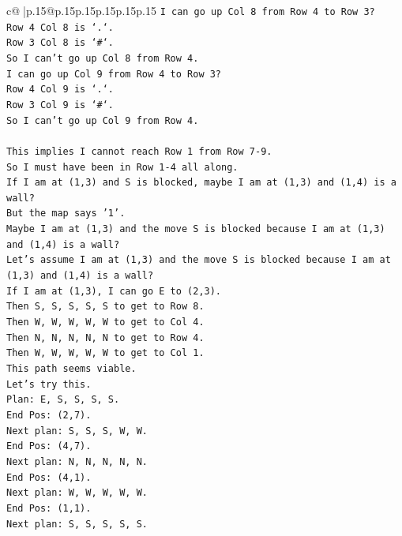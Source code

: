 \documentclass{article}
\begin{document}
{\begin{supertabular}{c@{$\;$}|p{.15\linewidth}@{}p{.15\linewidth}p{.15\linewidth}p{.15\linewidth}p{.15\linewidth}p{.15\linewidth}}
{{{\texttt{I can go up Col 8 from Row 4 to Row 3?} \\
\texttt{Row 4 Col 8 is `.`.} \\
\texttt{Row 3 Col 8 is `\#`.} \\
\texttt{So I can't go up Col 8 from Row 4.} \\
\texttt{I can go up Col 9 from Row 4 to Row 3?} \\
\texttt{Row 4 Col 9 is `.`.} \\
\texttt{Row 3 Col 9 is `\#`.} \\
\texttt{So I can't go up Col 9 from Row 4.} \\
\\ 
\texttt{This implies I cannot reach Row 1 from Row 7{-}9.} \\
\texttt{So I must have been in Row 1{-}4 all along.} \\
\texttt{If I am at (1,3) and S is blocked, maybe I am at (1,3) and (1,4) is a wall?} \\
\texttt{But the map says '1'.} \\
\texttt{Maybe I am at (1,3) and the move S is blocked because I am at (1,3) and (1,4) is a wall?} \\
\texttt{Let's assume I am at (1,3) and the move S is blocked because I am at (1,3) and (1,4) is a wall?} \\
\texttt{If I am at (1,3), I can go E to (2,3).} \\
\texttt{Then S, S, S, S, S to get to Row 8.} \\
\texttt{Then W, W, W, W, W to get to Col 4.} \\
\texttt{Then N, N, N, N, N to get to Row 4.} \\
\texttt{Then W, W, W, W, W to get to Col 1.} \\
\texttt{This path seems viable.} \\
\texttt{Let's try this.} \\
\texttt{Plan: E, S, S, S, S.} \\
\texttt{End Pos: (2,7).} \\
\texttt{Next plan: S, S, S, W, W.} \\
\texttt{End Pos: (4,7).} \\
\texttt{Next plan: N, N, N, N, N.} \\
\texttt{End Pos: (4,1).} \\
\texttt{Next plan: W, W, W, W, W.} \\
\texttt{End Pos: (1,1).} \\
\texttt{Next plan: S, S, S, S, S.} \\
}}}
\end{supertabular}}
\end{document}

